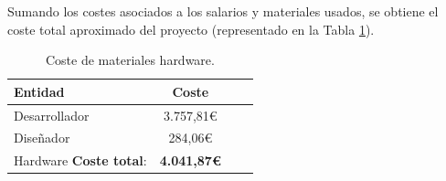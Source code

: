 Sumando los costes asociados a los salarios y materiales usados, se obtiene el coste total aproximado del proyecto (representado en la Tabla \ref{tab:coste-total}).

\begin{table}[H]
    \begin{center}
    \begin{tabular}{| l | c | c | c |}
        \hline
        \textbf{Entidad} & \textbf{Coste} \\ \hline
        Desarrollador & 3.757,81\euro \\
        Diseñador  & 284,06\euro \\ \hline
        Hardware
        \textbf{Coste total}: & \textbf{4.041,87\euro} \\ \hline
    \end{tabular}
    \caption{Coste de materiales hardware.}
    \label{tab:coste-total}
    \end{center}
\end{table} 